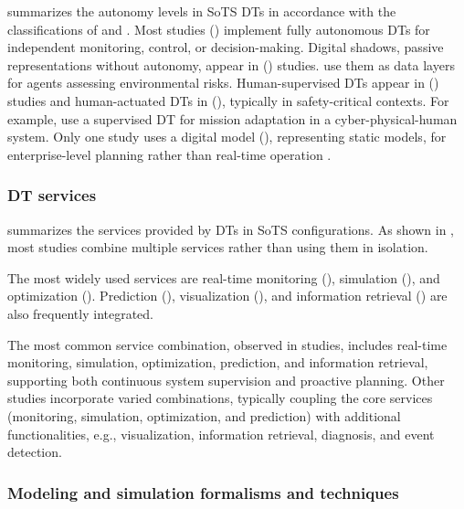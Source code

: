 

 summarizes the autonomy levels in SoTS DTs in accordance with the classifications of \textcite{kritzinger2018digital} and \textcite{david2024infonomics}. 
Most studies () implement fully autonomous DTs for independent monitoring, control, or decision-making.
Digital shadows, passive representations without autonomy, appear in () studies. \textcite{hofmeister2024semantic} use them as data layers for agents assessing environmental risks.
Human-supervised DTs appear in () studies and human-actuated DTs in (), typically in safety-critical contexts. For example, \textcite{folds2019digital} use a supervised DT for mission adaptation in a cyber-physical-human system.
Only one study uses a digital model (), representing static models, for enterprise-level planning rather than real-time operation \cite{kulkarni2019towards}.


\subsubsection{DT services}\label{sec:dt-services}



 summarizes the services provided by DTs in SoTS configurations. As shown in , most studies combine multiple services rather than using them in isolation.

The most widely used services are real-time monitoring (), simulation (), and optimization (). Prediction (), visualization (), and information retrieval () are also frequently integrated.

The most common service combination, observed in  studies, includes real-time monitoring, simulation, optimization, prediction, and information retrieval, supporting both continuous system supervision and proactive planning. Other studies incorporate varied combinations, typically coupling the core services (monitoring, simulation, optimization, and prediction) with additional functionalities, e.g., visualization, information retrieval, diagnosis, and event detection.



\subsubsection{Modeling and simulation formalisms and techniques}\label{sec:modeling-methods}

